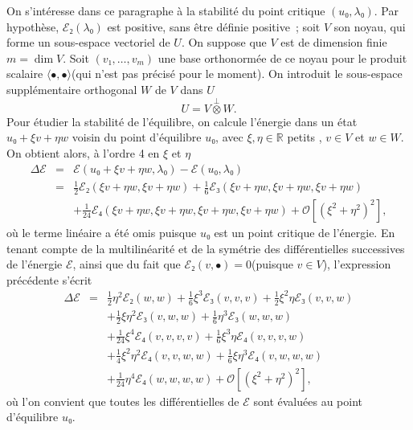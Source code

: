 \documentclass[12pt, final]{amsart}
\theoremstyle{definition}
\begin{document}
On s'intéresse dans ce paragraphe à la stabilité du point critique \((u₀, λ₀) .\) Par hypothèse, \(ℰ₂(λ₀)\) est positive, sans être définie positive~; soit \(V\) son noyau, qui forme un sous-espace vectoriel de \(U\). On suppose que \(V\) est de dimension finie \(m = \dim V\). Soit \((v₁, \ldots, v_m)\) une base orthonormée de ce noyau pour le produit scalaire \(〈 •, • 〉\)(qui n'est pas précisé pour le moment). On introduit le sous-espace supplémentaire orthogonal \(W\) de \(V\) dans \(U\)
\begin{equation}
 U = V \overset{\perp}{\otimes} W.
\end{equation}
Pour étudier la stabilité de l'équilibre, on calcule l'énergie dans un état \(u₀ + ξ v + η w\) voisin du point d'équilibre \(u₀\), avec \(ξ, η∈\mathbb{R}\) {\guillemotleft} petits {\guillemotright}, \(v \in V\) et \(w∈W\). On obtient alors, à l'ordre 4 en \(ξ\) et \(η\)
\begin{eqnarray}
 \Delta ℰ & = & ℰ(u₀ + ξ v + η w, λ₀)
 -ℰ(u₀, λ₀) \nonumber\\
 & = & \tfrac{1}{2} ℰ₂(ξ v + η w, ξ v + η w) +
 \tfrac{1}{6} ℰ₃(ξ v + η w, ξ v + η w, ξ v + η w)
 \nonumber\\
 & & + \tfrac{1}{24} ℰ₄(ξ v + η w, ξ v + η
 w, ξ v + η w, ξ v + η w) +\mathcal{O} [(ξ^2 + η^2)^2],
\end{eqnarray}
où le terme linéaire a été omis puisque \(u₀\) est un point critique de l'énergie. En tenant compte de la multilinéarité et de la symétrie des différentielles successives de l'énergie \(ℰ\), ainsi que du fait que \(ℰ₂(v, •) = 0\)(puisque \(v∈V\)), l'expression précédente s'écrit
\begin{eqnarray}
 \Delta ℰ & = & \tfrac{1}{2} η^2 ℰ₂(w, w) +
 \tfrac{1}{6} ξ^3 ℰ₃(v, v, v) + \tfrac{1}{2} ξ^2 η
 ℰ₃(v, v, w) \nonumber\\
 & & + \tfrac{1}{2} ξ η^2 ℰ₃(v, w, w) + \tfrac{1}{6}
 η^3 ℰ₃(w, w, w) \nonumber\\
 & & + \tfrac{1}{24} ξ^4 ℰ₄(v, v, v, v) + \tfrac{1}{6} ξ^3
 η ℰ₄(v, v, v, w) \nonumber\\
 & & + \tfrac{1}{4} ξ^2 η^2 ℰ₄(v, v, w, w) + \tfrac{1}{6}
 ξ η^3 ℰ₄(v, w, w, w) \nonumber\\
 & & + \tfrac{1}{24} η^4 ℰ₄(w, w, w, w) +\mathcal{O} [(ξ^2
 + η^2)^2],
\end{eqnarray}
où l'on convient que toutes les différentielles de \(ℰ\) sont évaluées au point d'équilibre \(u₀\).
\end{document}
